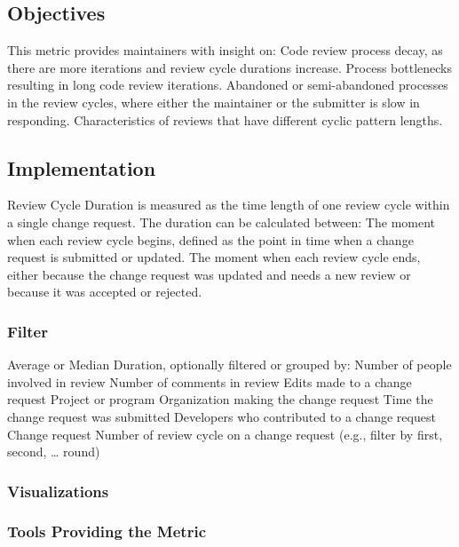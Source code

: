 \documentclass[
  12pt,
]{article}
\begin{document}
\hypertarget{objectives-4}{%
\subsection{Objectives}\label{objectives-4}}

This metric provides maintainers with insight on: Code review process
decay, as there are more iterations and review cycle durations increase.
Process bottlenecks resulting in long code review iterations. Abandoned
or semi-abandoned processes in the review cycles, where either the
maintainer or the submitter is slow in responding. Characteristics of
reviews that have different cyclic pattern lengths.

\hypertarget{implementation-4}{%
\subsection{Implementation}\label{implementation-4}}

Review Cycle Duration is measured as the time length of one review cycle
within a single change request. The duration can be calculated between:
The moment when each review cycle begins, defined as the point in time
when a change request is submitted or updated. The moment when each
review cycle ends, either because the change request was updated and
needs a new review or because it was accepted or rejected.

\hypertarget{filter}{%
\subsubsection{Filter}\label{filter}}

Average or Median Duration, optionally filtered or grouped by: Number of
people involved in review Number of comments in review Edits made to a
change request Project or program Organization making the change request
Time the change request was submitted Developers who contributed to a
change request Change request Number of review cycle on a change request
(e.g., filter by first, second, \ldots{} round)

\hypertarget{visualizations-3}{%
\subsubsection{Visualizations}\label{visualizations-3}}

\hypertarget{tools-providing-the-metric-2}{%
\subsubsection{Tools Providing the
Metric}\label{tools-providing-the-metric-2}}
\end{document}
